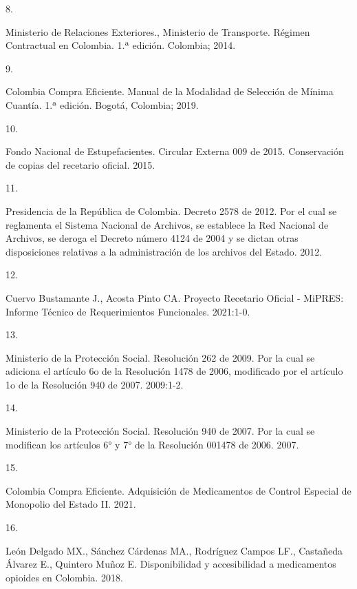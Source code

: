 \documentclass[
]{book}
\newlength{\cslhangindent}
\newlength{\csllabelwidth}
\newlength{\cslentryspacingunit} %
\newenvironment{CSLReferences}[2] %
 {%
  \setlength{\parindent}{0pt}
  \ifodd #1
  \let\oldpar\par
  \def\par{\hangindent=\cslhangindent\oldpar}
  \fi
  \setlength{\parskip}{#2\cslentryspacingunit}
 }%
 {}
\newcommand{\CSLLeftMargin}[1]{\parbox[t]{\csllabelwidth}{#1}}
\newcommand{\CSLRightInline}[1]{\parbox[t]{\linewidth - \csllabelwidth}{#1}\break}
\begin{document}
\begin{CSLReferences}{0}{0}
\leavevmode{}%
\CSLLeftMargin{8. }
\CSLRightInline{Ministerio de Relaciones Exteriores., Ministerio de Transporte. {R{é}gimen Contractual en Colombia}. 1.ª edición. Colombia; 2014.}

\leavevmode{}%
\CSLLeftMargin{9. }
\CSLRightInline{Colombia Compra Eficiente. {Manual de la Modalidad de Selecci{ó}n de M{í}nima Cuant{í}a}. 1.ª edición. Bogot{á}, Colombia; 2019.}

\leavevmode{}%
\CSLLeftMargin{10. }
\CSLRightInline{Fondo Nacional de Estupefacientes. {Circular Externa 009 de 2015. Conservaci{ó}n de copias del recetario oficial.} 2015.}

\leavevmode{}%
\CSLLeftMargin{11. }
\CSLRightInline{Presidencia de la República de Colombia. {Decreto 2578 de 2012. Por el cual se reglamenta el Sistema Nacional de Archivos, se establece la Red Nacional de Archivos, se deroga el Decreto n{ú}mero 4124 de 2004 y se dictan otras disposiciones relativas a la administraci{ó}n de los archivos del Estado.} 2012.}

\leavevmode{}%
\CSLLeftMargin{12. }
\CSLRightInline{Cuervo Bustamante J., Acosta Pinto CA. {Proyecto Recetario Oficial - MiPRES: Informe T{é}cnico de Requerimientos Funcionales}. 2021:1-0.}

\leavevmode{}%
\CSLLeftMargin{13. }
\CSLRightInline{Ministerio de la Protección Social. {Resoluci{ó}n 262 de 2009. Por la cual se adiciona el art{í}culo 6o de la Resoluci{ó}n 1478 de 2006, modificado por el art{í}culo 1o de la Resoluci{ó}n 940 de 2007.} 2009:1-2.}

\leavevmode{}%
\CSLLeftMargin{14. }
\CSLRightInline{Ministerio de la Protección Social. {Resoluci{ó}n 940 de 2007. Por la cual se modifican los art{í}culos 6° y 7° de la Resoluci{ó}n 001478 de 2006}. 2007.}

\leavevmode{}%
\CSLLeftMargin{15. }
\CSLRightInline{Colombia Compra Eficiente. {Adquisici{ó}n de Medicamentos de Control Especial de Monopolio del Estado II}. 2021.}

\leavevmode{}%
\CSLLeftMargin{16. }
\CSLRightInline{León Delgado MX., Sánchez Cárdenas MA., Rodríguez Campos LF., Castañeda Álvarez E., Quintero Muñoz E. {Disponibilidad y accesibilidad a medicamentos opioides en Colombia}. 2018.}


\end{CSLReferences}
\end{document}
